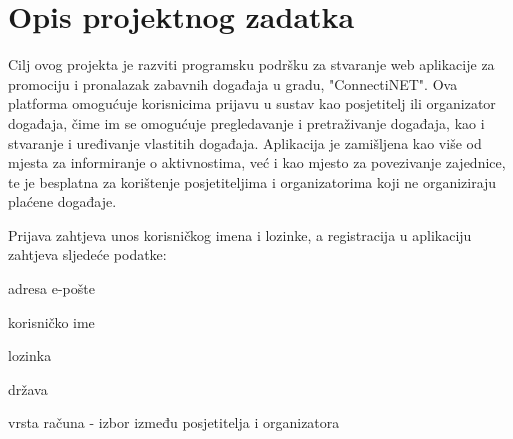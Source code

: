 \chapter{Opis projektnog zadatka}
		
		
		
		Cilj ovog projekta je razviti programsku podršku za stvaranje web aplikacije za promociju i pronalazak zabavnih događaja u gradu, "ConnectiNET". Ova platforma omogućuje korisnicima prijavu u sustav kao posjetitelj ili organizator događaja, čime im se omogućuje pregledavanje i pretraživanje događaja, kao i stvaranje i uređivanje vlastitih događaja. Aplikacija je zamišljena kao više od mjesta za informiranje o aktivnostima, već i kao mjesto za povezivanje zajednice, te je besplatna za korištenje posjetiteljima i organizatorima koji ne organiziraju plaćene događaje.
		
		Prijava zahtjeva unos korisničkog imena i lozinke, a registracija u aplikaciju zahtjeva sljedeće podatke:
		 \begin{packed_item}
			\item adresa e-pošte
		 	\item korisničko ime
			\item lozinka
			\item država
			\item vrsta računa - izbor između posjetitelja i organizatora
		 \end{packed_item}	


